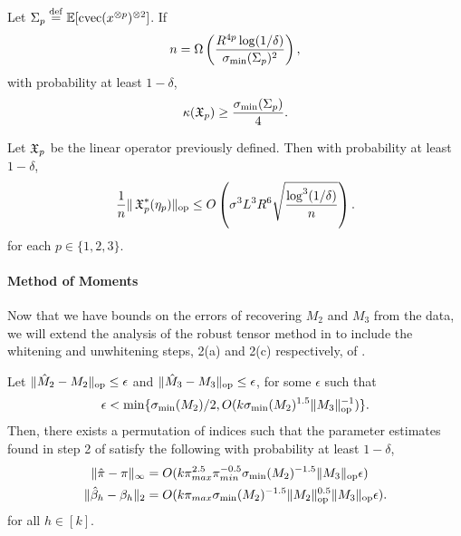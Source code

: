 
\begin{lemma}
\label{lem:lowRankLower}
Let $\Sigma_p \stackrel{\rm def}{=} \operatorname{\mathbb{E}}[\operatorname{cvec}(x^{\otimes p})^{\otimes 2}]$.
If $$n = \Omega \left( \frac{R^{4p} \log(1/\delta)}{\sigma_\text{\rm min}(\Sigma_p)^2} \right),$$
with probability at least $1-\delta$,
$$\kappa(\operatorname{\mathfrak{X}}_p) \ge \frac{\sigma_\text{\rm min}(\Sigma_p)}{4}.$$
\end{lemma}


\begin{lemma}
\label{lem:lowRankUpper}
Let $\operatorname{\mathfrak{X}}_p$ be the linear operator previously defined. Then with
probability at least $1-\delta$,
$$\frac1{n} \|\operatorname{\mathfrak{X}}_p^*(\eta_p)\|_{\textrm{op}} \le O\left(\sigma^3 L^3 R^6 \sqrt{\frac{\log^3(1/\delta)}{n}}\right).$$
for each $p \in \{1,2,3\}$.
\end{lemma}

\paragraph{Method of Moments} 

Now that we have bounds on the errors of recovering $M_2$ and $M_3$ from
the data, we will extend the analysis of the robust tensor method in
\citet{AnandkumarGeHsu2012} to include the whitening and unwhitening
steps, 2(a) and 2(c) respectively, of
.
\begin{lemma}
  \label{lem:tensorPower} Let $\|\hat M_2 - M_2\|_{\textrm{op}} \le \epsilon$ and
  $\|\hat M_3 - M_3\|_{\textrm{op}} \le \epsilon$, for some $\epsilon$ such that 
  $$\epsilon < \min\{\sigma_\text{\rm min}(M_2)/2,O(k \sigma_\text{\rm min}(M_2)^{1.5} \|M_3\|_{\textrm{op}}^{-1})\}.$$ 
  Then, there exists a permutation of indices such that  the parameter
  estimates found in step 2 of 
  satisfy the following with probability at least $1 - \delta$,
  \begin{align*}
  \|\hat \pi - \pi \|_{\infty}
    &= O( k \pi_{max}^{2.5} \pi_{min}^{-0.5} \sigma_\text{\rm min}(M_2)^{-1.5} \|M_3\|_{\textrm{op}} \epsilon ) \\
  \|\hat \beta_h - \beta_h\|_2
    &= O( k \pi_{max} \sigma_\text{\rm min}(M_2)^{-1.5} \|M_2\|_{\textrm{op}}^{0.5} \|M_3\|_{\textrm{op}} \epsilon ).
  \end{align*}
  for all $h \in [k]$.
\end{lemma}

